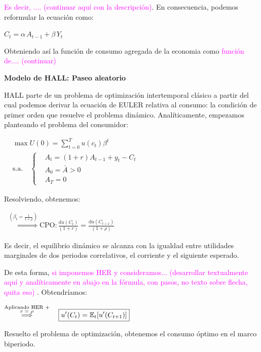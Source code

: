\documentclass[10pt,a4paper]{article}
\begin{document}
\textcolor{magenta}{Es decir, .... (continuar aquí con la descripción)}. En consecuencia, podemos reformular la ecuación como:

$C_t=\alpha \,A_{t-1}+\beta\, Y_t$

Obteniendo así la función de consumo agregada de la economia como \textcolor{magenta}{función de.... (continuar)}


\textbf{Modelo de HALL: Paseo aleatorio}

HALL parte de un problema de optimización intertemporal clásico a partir del cual podemos derivar la ecuación de EULER relativa al consumo: la condición de primer orden que resuelve el problema dinámico. Analíticamente, empezamos planteando el problema del consumidor:

$\begin{aligned}
      &\max U(0)=\sum_{t=0}^T u(c_t)\beta^t\\[0.5em]
      &\text{s.a.}\quad 
      \left\{\begin{aligned}
            &A_t=(1+r)A_{t-1}+y_t-C_t\\
            &A_0=\bar A>0\\
            &A_T=0
      \end{aligned}\right.
\end{aligned}$

Resolviendo, obtenemos:

$\begin{aligned}
  \overset{(\beta_t=\frac{1}{1+\rho})}{\Longrightarrow} \text{CPO}:\frac{\mathrm d u(C_t)}{(1+r)}=\frac{\mathrm d u(C_{t+1})}{(1+\rho)}
\end{aligned}$

Es decir, el equilibrio dinámico se alcanza con la igualdad entre utilidades marginales de dos periodos correlativos, el corriente y el siguiente esperado. 

De esta forma, \textcolor{magenta}{si imponemos HER y consideramos... (desarrollar textualmente aquí y analíticamente en abajo en la fórmula, con pasos, no texto sobre flecha, quita eso)} . Obtendríamos:

$\begin{aligned}
  \overset{\substack{\text{\scriptsize Aplicando HER +}\\\text{\scriptsize $r=\rho$}}}{\Longrightarrow}\quad \boxed{u'(C_t)=\mathbb E_t[u'(C_{t+1})]}
\end{aligned}$

Resuelto el problema de optimización, obtenemos el consumo óptimo en el marco biperiodo.
\end{document}
